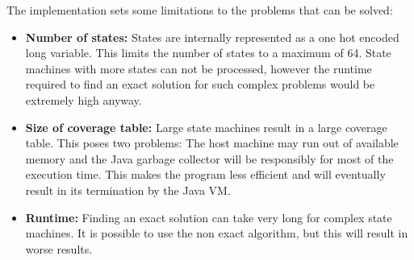 The implementation sets some limitations to the problems that can be solved:
\begin{itemize}
\item \textbf{Number of states:} States are internally represented as a one hot encoded long variable. This limits the number of states to a maximum of 64. State machines with more states can not be processed, however the runtime required to find an exact solution for such complex problems would be extremely high anyway.
\item \textbf{Size of coverage table:} Large state machines result in a large coverage table. This poses two problems: The host machine may run out of available memory and the Java garbage collector will be responsibly for most of the execution time. This makes the program less efficient and will eventually result in its termination by the Java VM.
\item \textbf{Runtime:} Finding an exact solution can take very long for complex state machines. It is possible to use the non exact algorithm, but this will result in worse results.
\end{itemize}
